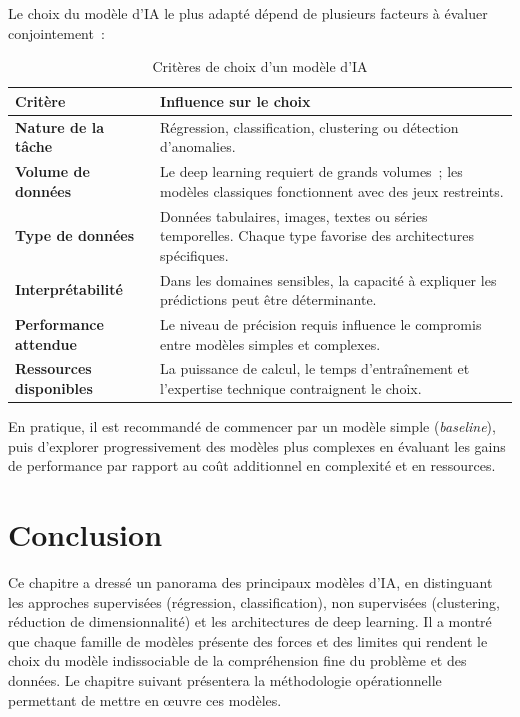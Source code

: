 Le choix du modèle d'IA le plus adapté dépend de plusieurs facteurs à évaluer conjointement~:

\begin{table}[H]
\centering
\caption{Critères de choix d'un modèle d'IA}
\label{tab:criteres-choix}
\renewcommand{\arraystretch}{1.4}
\begin{tabularx}{\textwidth}{|>{\bfseries}p{3cm}|X|}
\hline
\rowcolor{maingreen!15}\textbf{Critère} & \textbf{Influence sur le choix} \\
\hline
Nature de la tâche & Régression, classification, clustering ou détection d'anomalies. \\
\hline
Volume de données & Le deep learning requiert de grands volumes~; les modèles classiques fonctionnent avec des jeux restreints. \\
\hline
Type de données & Données tabulaires, images, textes ou séries temporelles. Chaque type favorise des architectures spécifiques. \\
\hline
Interprétabilité & Dans les domaines sensibles, la capacité à expliquer les prédictions peut être déterminante. \\
\hline
Performance attendue & Le niveau de précision requis influence le compromis entre modèles simples et complexes. \\
\hline
Ressources disponibles & La puissance de calcul, le temps d'entraînement et l'expertise technique contraignent le choix. \\
\hline
\end{tabularx}
\end{table}

En pratique, il est recommandé de commencer par un modèle simple (\textit{baseline}), puis d'explorer progressivement des modèles plus complexes en évaluant les gains de performance par rapport au coût additionnel en complexité et en ressources.

\section{Conclusion}

Ce chapitre a dressé un panorama des principaux modèles d'IA, en distinguant les approches supervisées (régression, classification), non supervisées (clustering, réduction de dimensionnalité) et les architectures de deep learning. Il a montré que chaque famille de modèles présente des forces et des limites qui rendent le choix du modèle indissociable de la compréhension fine du problème et des données. Le chapitre suivant présentera la méthodologie opérationnelle permettant de mettre en \oe{}uvre ces modèles.

\newpage
